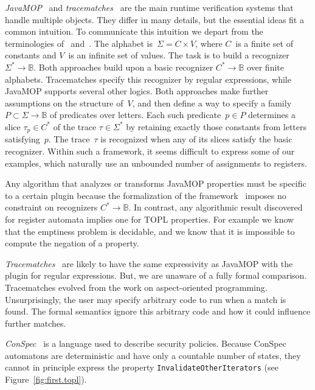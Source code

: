 \documentclass{article} %
\newcommand{\B}{\ensuremath{\mathbb{B}}}
\theoremstyle{definition}
\theoremstyle{remark}
\begin{document}
{\it JavaMOP\/}~\cite{dblp:journals/sttt/meredithjgcr12} and {\it tracematches\/}~\cite{dblp:conf/oopsla/allanachklmsst05} are the main runtime verification systems that handle multiple objects.
They differ in many details, but the essential ideas fit a common intuition.
To communicate this intuition we depart from the terminologies of \cite{dblp:journals/sttt/meredithjgcr12}~and~\cite{dblp:conf/oopsla/allanachklmsst05}.
The alphabet is~$\Sigma=C\times V$, where $C$~is a finite set of constants and $V$~is an infinite set of values.
The task is to build a recognizer $\Sigma^*\to\B$.
Both approaches build upon a basic recognizer $C^*\to\B$ over finite alphabets.
Tracematches specify this recognizer by regular expressions, while JavaMOP supports several other logics.
Both approaches make further assumptions on the structure of~$V$, and then define a way to specify a family $P\subset\Sigma\to\B$ of predicates over letters.
Each such predicate~$p\in P$ determines a slice $\tau_p\in C^*$ of the trace $\tau\in\Sigma^*$ by retaining exactly those constants from letters satisfying~$p$.
The trace~$\tau$ is recognized when any of its slices satisfy the basic recognizer.
Within such a framework, it seems difficult to express some of our examples, which naturally use an unbounded number of assignments to registers.

Any algorithm that analyzes or transforms JavaMOP properties must be specific to a certain plugin because the formalization of the framework~\cite{dblp:journals/corr/abs-1112-5761} imposes no constraint on recognizers $C^*\to\B$.
In contrast, any algorithmic result discovered for register automata implies one for TOPL properties.
For example we know that the emptiness problem is decidable, and we know that it is impossible to compute the negation of a property.

{\it Tracematches\/}~\cite{dblp:conf/oopsla/allanachklmsst05} are likely to have the same expressivity as JavaMOP with the plugin for regular expressions.
But, we are unaware of a fully formal comparison.
Tracematches evolved from the work on aspect-oriented programming.
Unsurprisingly, the user may specify arbitrary code to run when a match is found.
The formal semantics ignore this arbitrary code and how it could influence further matches.

{\it ConSpec\/}~\cite{DBLP:journals/entcs/AktugN08} is a language used to describe security policies.
Because ConSpec automatons are deterministic and have only a countable number of states, they cannot in principle express the property \texttt{InvalidateOtherIterators} (see Figure~\ref{fig:first.topl}).
\end{document}
